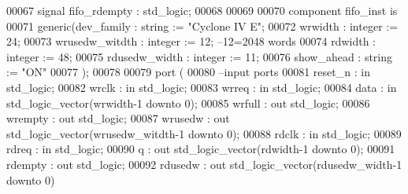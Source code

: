 \begin{DoxyCode}
00067 \textcolor{keywordflow}{signal} \textcolor{vhdlchar}{fifo_rdempty} \textcolor{vhdlchar}{:} \textcolor{comment}{std\_logic};
00068 
00069 
00070 \textcolor{keywordflow}{component} fifo_inst \textcolor{keywordflow}{is}
00071   \textcolor{keywordflow}{generic}(dev_family         : \textcolor{comment}{string}  := \textcolor{keyword}{"Cyclone IV E"};
00072           wrwidth         : \textcolor{comment}{integer} := \textcolor{vhdllogic}{}\textcolor{vhdllogic}{24};
00073           wrusedw_witdth  : \textcolor{comment}{integer} := \textcolor{vhdllogic}{}\textcolor{vhdllogic}{12}; \textcolor{keyword}{--12=2048 words }
00074           rdwidth         : \textcolor{comment}{integer} := \textcolor{vhdllogic}{}\textcolor{vhdllogic}{48};
00075           rdusedw_width   : \textcolor{comment}{integer} := \textcolor{vhdllogic}{}\textcolor{vhdllogic}{11};
00076           show_ahead      : \textcolor{comment}{string}  := \textcolor{keyword}{"ON"}
00077   );  
00078 
00079   \textcolor{keywordflow}{port} (
00080 \textcolor{keyword}{      --input ports }
00081       reset_n       : \textcolor{keywordflow}{in} \textcolor{comment}{std\_logic};
00082       wrclk         : \textcolor{keywordflow}{in} \textcolor{comment}{std\_logic};
00083       wrreq         : \textcolor{keywordflow}{in} \textcolor{comment}{std\_logic};
00084       data          : \textcolor{keywordflow}{in} \textcolor{comment}{std\_logic\_vector}(wrwidth\textcolor{vhdlchar}{-}\textcolor{vhdllogic}{}\textcolor{vhdllogic}{1} \textcolor{keywordflow}{downto} \textcolor{vhdllogic}{}\textcolor{vhdllogic}{0});
00085       wrfull        : \textcolor{keywordflow}{out} \textcolor{comment}{std\_logic};
00086         wrempty       : \textcolor{keywordflow}{out} \textcolor{comment}{std\_logic};
00087       wrusedw       : \textcolor{keywordflow}{out} \textcolor{comment}{std\_logic\_vector}(wrusedw_witdth\textcolor{vhdlchar}{-}\textcolor{vhdllogic}{}\textcolor{vhdllogic}{1} \textcolor{keywordflow}{downto} \textcolor{vhdllogic}{}\textcolor{vhdllogic}{0});
00088       rdclk          : \textcolor{keywordflow}{in} \textcolor{comment}{std\_logic};
00089       rdreq         : \textcolor{keywordflow}{in} \textcolor{comment}{std\_logic};
00090       q             : \textcolor{keywordflow}{out} \textcolor{comment}{std\_logic\_vector}(rdwidth\textcolor{vhdlchar}{-}\textcolor{vhdllogic}{}\textcolor{vhdllogic}{1} \textcolor{keywordflow}{downto} \textcolor{vhdllogic}{}\textcolor{vhdllogic}{0});
00091       rdempty       : \textcolor{keywordflow}{out} \textcolor{comment}{std\_logic};
00092       rdusedw       : \textcolor{keywordflow}{out} \textcolor{comment}{std\_logic\_vector}(rdusedw_width\textcolor{vhdlchar}{-}\textcolor{vhdllogic}{}\textcolor{vhdllogic}{1} \textcolor{keywordflow}{downto} \textcolor{vhdllogic}{}\textcolor{vhdllogic}{0})     

\end{DoxyCode}
